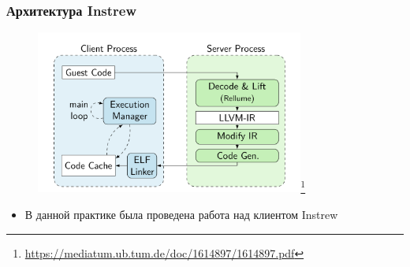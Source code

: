 \documentclass{beamer}
\begin{document}




\begin{frame}[fragile]
  \frametitle{Архитектура Instrew}
  \begin{figure}
    \centering
    \includegraphics[width=250pt]{pictures/instrew-arch-disser.png}\footnote{\href{https://mediatum.ub.tum.de/doc/1614897/1614897.pdf}{https://mediatum.ub.tum.de/doc/1614897/1614897.pdf}}
  \end{figure}
  \begin{itemize}
    \item В данной практике была проведена работа над клиентом Instrew
  \end{itemize}
\end{frame}
\end{document}
